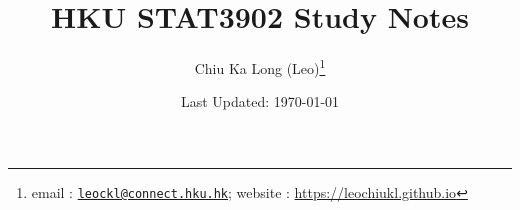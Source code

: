 \documentclass{article}
\begin{document}
\title{HKU STAT3902 Study Notes}
\author{Chiu Ka Long (Leo)\thanks{email :
\href{mailto:leockl@connect.hku.hk}{\texttt{leockl@connect.hku.hk}};
website :
\url{https://leochiukl.github.io}
}}
\date{Last Updated: \today}
\maketitle
\doclicenseThis
\nocite{*}
\tableofcontents

\printbibliography

\end{document}
